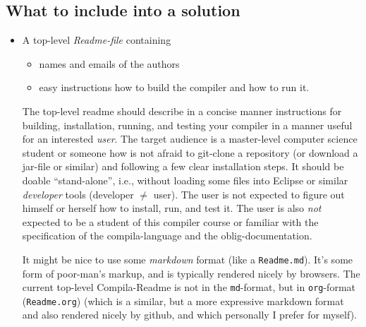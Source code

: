 \documentclass[10pt,freeform]{handout}[2014/08/13]
\begin{document}
\subsection{What to include into a solution}
\label{sec:what-include-into}


\begin{itemize}
\item A top-level \emph{Readme-file} containing
  \begin{itemize}
  \item names and emails of the authors
  \item easy instructions how to build the compiler and how to run it.
  \end{itemize}
  The top-level readme should describe in a concise manner instructions for
  building, installation, running, and testing your compiler in a manner
  useful for an interested \emph{user}. The target audience is a
  master-level computer science student or someone how is not afraid to
  git-clone a repository (or download a jar-file or similar) and following
  a few clear installation steps. It should be doable ``stand-alone'',
  i.e., without loading some files into Eclipse or similar \emph{developer}
  tools (developer $\not=$ user). The user is not expected to figure out
  himself or herself how to install, run, and test it. The user is also
  \emph{not} expected to be a student of this compiler course or familiar
  with the specification of the compila-language and the
  oblig-documentation.

  It might be nice to use some \emph{markdown} format (like a
  \texttt{Readme.md}). It's some form of poor-man's markup, and is
  typically rendered nicely by browsers. The current top-level
  Compila-Readme is not in the \texttt{md}-format, but in
  \texttt{org}-format (\texttt{Readme.org}) (which is a similar, but a more
  expressive markdown format and also rendered nicely by github, and which
  personally I prefer for myself).
  

\end{itemize}
\end{document}
